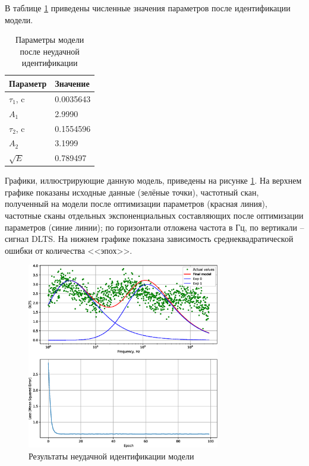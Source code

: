 \documentclass{report}
\begin{document}
        В таблице \ref{table:table10} приведены численные значения параметров 
        после идентификации модели.

        \begin{table}[ht]
            \caption{Параметры модели после неудачной идентификации}
            \label{table:table10}
            \centering
            \begin{tabular}{ | l | l | }
                \hline
                Параметр & Значение \\
                \hline
                $\tau_1$, c & 0.0035643 \\
                $A_1$ & 2.9990 \\
                \hline
                $\tau_2$, c & 0.1554596 \\
                $A_2$ & 3.1999 \\
                \hline
                $\sqrt{E}$ & 0.789497 \\
                \hline
            \end{tabular}
        \end{table}

        Графики, иллюстрирующие данную модель, приведены на рисунке \ref{pic:pic8}.
        На верхнем графике показаны исходные данные (зелёные точки), частотный скан, 
        полученный на модели после оптимизации параметров (красная линия), 
        частотные сканы отдельных экспоненциальных составляющих после оптимизации 
        параметров (синие линии); по горизонтали отложена частота в Гц, по 
        вертикали -- сигнал DLTS. На нижнем графике показана зависимость 
        среднеквадратической ошибки от количества <<эпох>>.
        \begin{figure}[ht]
            \centering
            \includegraphics[width=0.75\textwidth]{unsuccessful_identification_2}
            \caption{Результаты неудачной идентификации модели}
            \label{pic:pic8}
        \end{figure}
\end{document}
